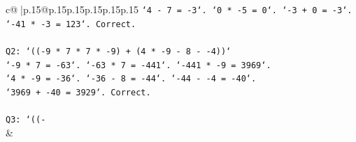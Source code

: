 \documentclass{article}
\begin{document}
{\begin{supertabular}{c@{$\;$}|p{.15\linewidth}@{}p{.15\linewidth}p{.15\linewidth}p{.15\linewidth}p{.15\linewidth}p{.15\linewidth}}
{{{\texttt{`4 {-} 7 = {-}3`. `0 * {-}5 = 0`. `{-}3 + 0 = {-}3`.} \\
\texttt{`{-}41 * {-}3 = 123`. Correct.} \\
\\ 
\texttt{Q2: `(({-}9 * 7 * 7 * {-}9) + (4 * {-}9 {-} 8 {-} {-}4))`} \\
\texttt{`{-}9 * 7 = {-}63`. `{-}63 * 7 = {-}441`. `{-}441 * {-}9 = 3969`.} \\
\texttt{`4 * {-}9 = {-}36`. `{-}36 {-} 8 = {-}44`. `{-}44 {-} {-}4 = {-}40`.} \\
\texttt{`3969 + {-}40 = 3929`. Correct.} \\
\\ 
\texttt{Q3: `(({-}} \\
            }
        }
    }
    & \\ \\

\end{supertabular}
}
\end{document}
